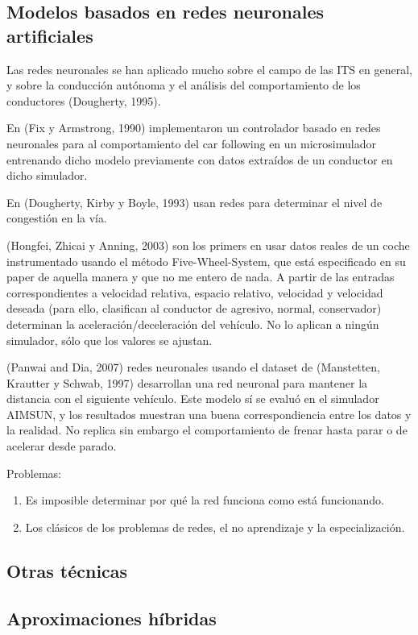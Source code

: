 \subsection{Modelos basados en redes neuronales artificiales}

Las redes neuronales se han aplicado mucho sobre el campo de las ITS en general, y sobre la conducción autónoma y el análisis del comportamiento de los conductores (Dougherty, 1995).

En (Fix y Armstrong, 1990) implementaron un controlador basado en redes neuronales para al comportamiento del car following en un microsimulador entrenando dicho modelo previamente con datos extraídos de un conductor en dicho simulador.

En (Dougherty, Kirby y Boyle, 1993) usan redes para determinar el nivel de congestión en la vía.

(Hongfei, Zhicai y Anning, 2003) son los primers en usar datos reales de un coche instrumentado usando el método Five-Wheel-System, que está especificado en su paper de aquella manera y que no me entero de nada. A partir de las entradas correspondientes a velocidad relativa, espacio relativo, velocidad y velocidad deseada (para ello, clasifican al conductor de agresivo, normal, conservador) determinan la aceleración/deceleración del vehículo. No lo aplican a ningún simulador, sólo que los valores se ajustan.

(Panwai and Dia, 2007) redes neuronales usando el dataset de (Manstetten, Krautter y Schwab, 1997) desarrollan una red neuronal para mantener la distancia con el siguiente vehículo. Este modelo sí se evaluó en el simulador AIMSUN, y los resultados muestran una buena correspondiencia entre los datos y la realidad. No replica sin embargo el comportamiento de frenar hasta parar o de acelerar desde parado.

Problemas:

\begin{enumerate}
	\item Es imposible determinar por qué la red funciona como está funcionando.
	\item Los clásicos de los problemas de redes, el no aprendizaje y la especialización.
\end{enumerate}

\subsection{Otras técnicas}

\subsection{Aproximaciones híbridas}

